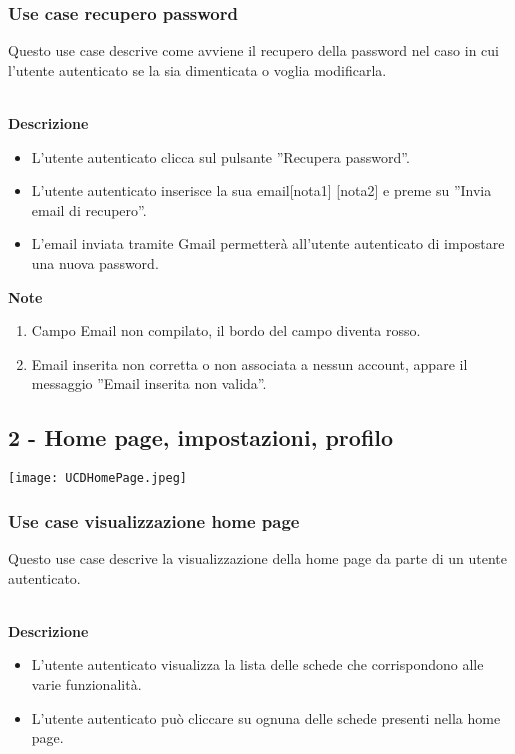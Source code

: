 \documentclass[a4paper,12pt]{article}
\begin{document}
\subsubsection*{Use case recupero password}

Questo use case descrive come avviene il recupero della password nel caso in cui l'utente autenticato se la sia dimenticata o voglia modificarla.

\textbf{\\Descrizione}
\begin{itemize} \setlength\itemsep{0.01em}
\item L'utente autenticato clicca sul pulsante ''Recupera password''.
\item L'utente autenticato inserisce la sua email[nota1] [nota2] e preme su ''Invia email di recupero''.
\item L'email inviata tramite Gmail permetterà all'utente autenticato di impostare una nuova password.
\end{itemize}

\textbf{Note}
\begin{enumerate} \setlength\itemsep{0.01em}
\item Campo Email non compilato, il bordo del campo diventa rosso.
\item Email inserita non corretta o non associata a nessun account, appare il messaggio ''Email inserita non valida''.
\end{enumerate}


\subsection*{2 - Home page, impostazioni, profilo}
\begin{center}
  \texttt{[image: UCDHomePage.jpeg]}
\end{center}


\subsubsection*{Use case visualizzazione home page}

Questo use case descrive la visualizzazione della home page da parte di un utente autenticato.

\textbf{\\Descrizione}
\begin{itemize} \setlength\itemsep{0.01em}
\item L'utente autenticato visualizza la lista delle schede che corrispondono alle varie funzionalità.
\item L'utente autenticato può cliccare su ognuna delle schede presenti nella home page.
\end{itemize}
\end{document}
